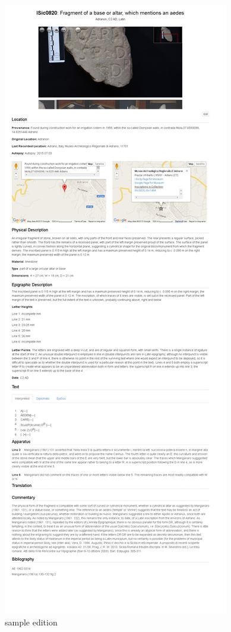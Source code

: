 \documentclass[amsthm,ebook]{saparticle}
\begin{document}
\begin{figure}[!bp]
\centering
 \includegraphics[width=0.6\columnwidth]{EAGLE2016ISicilyfinalcopy-img001.jpg}
\caption{sample edition}
\label{fig:1}
\end{figure}
\end{document}
